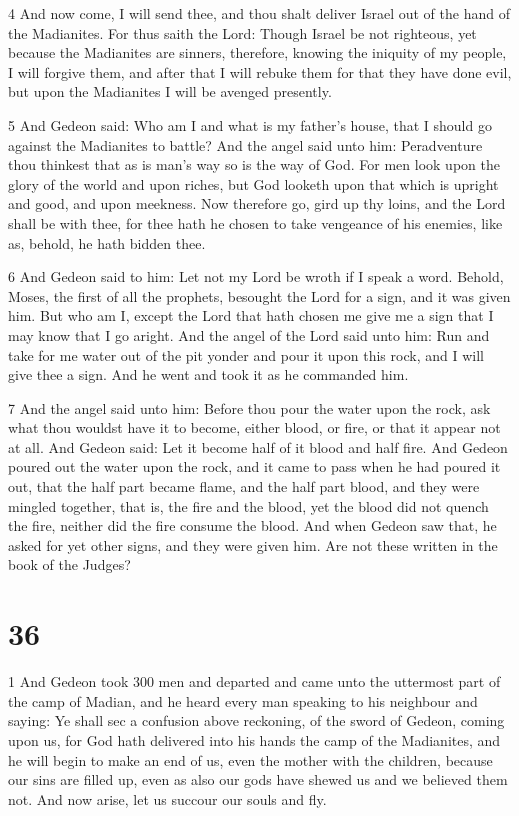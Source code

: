 \par 4 And now come, I will send thee, and thou shalt deliver Israel out of the hand of the Madianites. For thus saith the Lord: Though Israel be not righteous, yet because the Madianites are sinners, therefore, knowing the iniquity of my people, I will forgive them, and after that I will rebuke them for that they have done evil, but upon the Madianites I will be avenged presently. 

\par 5 And Gedeon said: Who am I and what is my father's house, that I should go against the Madianites to battle? And the angel said unto him: Peradventure thou thinkest that as is man's way so is the way of God. For men look upon the glory of the world and upon riches, but God looketh upon that which is upright and good, and upon meekness. Now therefore go, gird up thy loins, and the Lord shall be with thee, for thee hath he chosen to take vengeance of his enemies, like as, behold, he hath bidden thee. 

\par 6 And Gedeon said to him: Let not my Lord be wroth if I speak a word. Behold, Moses, the first of all the prophets, besought the Lord for a sign, and it was given him. But who am I, except the Lord that hath chosen me give me a sign that I may know that I go aright. And the angel of the Lord said unto him: Run and take for me water out of the pit yonder and pour it upon this rock, and I will give thee a sign. And he went and took it as he commanded him. 

\par 7 And the angel said unto him: Before thou pour the water upon the rock, ask what thou wouldst have it to become, either blood, or fire, or that it appear not at all. And Gedeon said: Let it become half of it blood and half fire. And Gedeon poured out the water upon the rock, and it came to pass when he had poured it out, that the half part became flame, and the half part blood, and they were mingled together, that is, the fire and the blood, yet the blood did not quench the fire, neither did the fire consume the blood. And when Gedeon saw that, he asked for yet other signs, and they were given him. Are not these written in the book of the Judges?

\chapter{36}

\par 1 And Gedeon took 300 men and departed and came unto the uttermost part of the camp of Madian, and he heard every man speaking to his neighbour and saying: Ye shall sec a confusion above reckoning, of the sword of Gedeon, coming upon us, for God hath delivered into his hands the camp of the Madianites, and he will begin to make an end of us, even the mother with the children, because our sins are filled up, even as also our gods have shewed us and we believed them not. And now arise, let us succour our souls and fly. 

